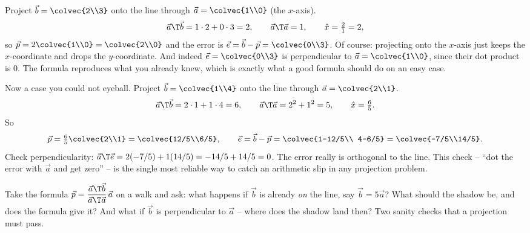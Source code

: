 \begin{example}\label{ch18:line-numeric}
Project $\vec{b}=\colvec{2\\3}$ onto the line through $\vec{a}=\colvec{1\\0}$ (the $x$-axis).
\[
  \vec{a}\T\vec{b} = 1\cdot 2 + 0\cdot 3 = 2,
  \qquad
  \vec{a}\T\vec{a} = 1,
  \qquad
  \hat{x} = \tfrac{2}{1} = 2,
\]
so $\vec{p} = 2\colvec{1\\0} = \colvec{2\\0}$ and the error is
$\vec{e} = \vec{b}-\vec{p} = \colvec{0\\3}$. Of course: projecting onto the $x$-axis just keeps the
$x$-coordinate and drops the $y$-coordinate. And indeed $\vec{e}=\colvec{0\\3}$ is perpendicular to
$\vec{a}=\colvec{1\\0}$, since their dot product is $0$. The formula reproduces what you already
knew, which is exactly what a good formula should do on an easy case.
\end{example}

\begin{example}\label{ch18:line-diagonal}
Now a case you could not eyeball. Project $\vec{b}=\colvec{1\\4}$ onto the line through
$\vec{a}=\colvec{2\\1}$.
\[
  \vec{a}\T\vec{b} = 2\cdot1 + 1\cdot4 = 6,
  \qquad
  \vec{a}\T\vec{a} = 2^2 + 1^2 = 5,
  \qquad
  \hat{x} = \tfrac{6}{5}.
\]
So
\[
  \vec{p} = \tfrac{6}{5}\colvec{2\\1} = \colvec{12/5\\6/5},
  \qquad
  \vec{e} = \vec{b}-\vec{p} = \colvec{1-12/5\\ 4-6/5} = \colvec{-7/5\\14/5}.
\]
Check perpendicularity: $\vec{a}\T\vec{e} = 2(-7/5)+1(14/5) = -14/5+14/5 = 0$. The error really is
orthogonal to the line. This check -- ``dot the error with $\vec{a}$ and get zero'' -- is the single
most reliable way to catch an arithmetic slip in any projection problem.
\end{example}

\begin{walkbox}
Take the formula $\vec{p} = \dfrac{\vec{a}\T\vec{b}}{\vec{a}\T\vec{a}}\,\vec{a}$ on a walk and ask:
what happens if $\vec{b}$ is already \emph{on} the line, say $\vec{b}=5\vec{a}$? What should the
shadow be, and does the formula give it? And what if $\vec{b}$ is perpendicular to $\vec{a}$ -- where
does the shadow land then? Two sanity checks that a projection must pass.
\end{walkbox}

